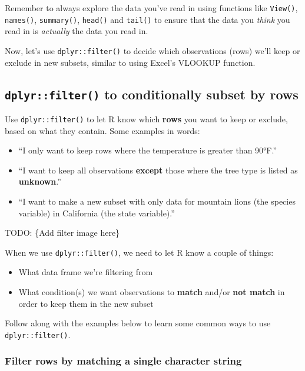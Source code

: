 \documentclass[]{book}
\providecommand{\tightlist}{%
  \setlength{\itemsep}{0pt}\setlength{\parskip}{0pt}}
\begin{document}
Remember to always explore the data you've read in using functions like \texttt{View()}, \texttt{names()}, \texttt{summary()}, \texttt{head()} and \texttt{tail()} to ensure that the data you \emph{think} you read in is \emph{actually} the data you read in.

Now, let's use \texttt{dplyr::filter()} to decide which observations (rows) we'll keep or exclude in new subsets, similar to using Excel's VLOOKUP function.

\hypertarget{dplyrfilter-to-conditionally-subset-by-rows}{%
\subsection{\texorpdfstring{\texttt{dplyr::filter()} to conditionally subset by rows}{dplyr::filter() to conditionally subset by rows}}\label{dplyrfilter-to-conditionally-subset-by-rows}}

Use \texttt{dplyr::filter()} to let R know which \textbf{rows} you want to keep or exclude, based on what they contain. Some examples in words:

\begin{itemize}
\tightlist
\item
  ``I only want to keep rows where the temperature is greater than 90°F.''
\item
  ``I want to keep all observations \textbf{except} those where the tree type is listed as \textbf{unknown}.''
\item
  ``I want to make a new subset with only data for mountain lions (the species variable) in California (the state variable).''
\end{itemize}

TODO: \{Add filter image here\}

When we use \texttt{dplyr::filter()}, we need to let R know a couple of things:

\begin{itemize}
\tightlist
\item
  What data frame we're filtering from
\item
  What condition(s) we want observations to \textbf{match} and/or \textbf{not match} in order to keep them in the new subset
\end{itemize}

Follow along with the examples below to learn some common ways to use \texttt{dplyr::filter()}.

\hypertarget{filter-rows-by-matching-a-single-character-string}{%
\subsubsection{Filter rows by matching a single character string}\label{filter-rows-by-matching-a-single-character-string}}
\end{document}

